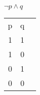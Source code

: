 \documentclass{article}
\begin{document}
$\neg p\land q$
\begin{tabular}{|c|c|c|}
\hline
p & q \\
1 & 1 \\
1 & 0 \\
0 & 1 \\
0 & 0 \\
\hline

\end{tabular}
\end{document}
